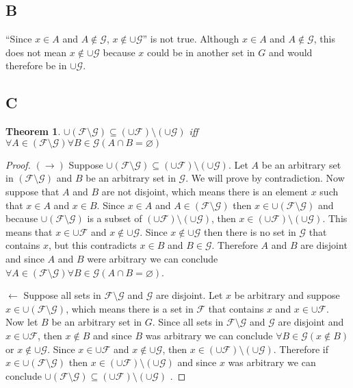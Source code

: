 \documentclass{article}
\newcommand{\F}{\mathcal{F}}
\newcommand{\G}{\mathcal{G}}
\newtheorem*{theorem}{Theorem}  %
\begin{document}
\subsection*{B}
``Since $x \in A$ and $A \notin \G$, $x \notin \cup \G$'' is not true. Although $x \in A$ and $A \notin \G$, this does not mean $x \notin \cup \G$ because $x$ could be in another set in $G$ and would therefore be in $\cup \G$.

\subsection*{C}
\begin{theorem} $\cup ( \F \setminus \G) \subseteq (\cup \F) \setminus (\cup \G)$ iff $ \forall A \in (\F \setminus \G) \forall B \in \G(A \cap B = \varnothing)$
\end{theorem}

\begin{proof} 
$(\rightarrow)$ Suppose $\cup ( \F \setminus \G) \subseteq (\cup \F) \setminus (\cup \G)$. Let $A$ be an arbitrary set in $(\F \setminus \G)$ and $B$ be an arbitrary set in $\G$. We will prove by contradiction. Now suppose that $A$ and $B$ are not disjoint, which means there is an element $x$ such that $x \in A$ and $x \in B$. Since $x \in A$ and $A \in (\F \setminus \G)$ then $x \in \cup (\F \setminus \G)$ and because $\cup (\F \setminus \G)$ is a subset of $(\cup \F) \setminus (\cup\G)$, then $x \in (\cup \F) \setminus (\cup \G)$. This means that $x \in \cup \F$ and $x \notin \cup \G$. Since $x \notin \cup \G$ then there is no set in $\G$ that contains $x$, but this contradicts $x \in B$ and $B \in \G$. Therefore $A$ and $B$ are disjoint and since $A$ and $B$ were arbitrary we can conclude $\forall A \in (\F \setminus \G) \forall B \in \G (A \cap B = \varnothing)$.

$\leftarrow$ Suppose all sets in $\F \setminus \G$ and $\G$ are disjoint. Let $x$ be arbitrary and suppose $x \in \cup(\F \setminus \G)$, which means there is a set in $\F$ that contains $x$ and $x \in \cup \F$. Now let $B$ be an arbitrary set in $G$. Since all sets in $\F \setminus \G$ and $\G$ are disjoint and $x \in \cup \F$, then $x \notin B$ and since $B$ was arbitrary we can conclude $\forall B \in \G(x \notin B)$ or $x \notin \cup \G$. Since $x \in \cup \F$ and $x \notin \cup \G$, then $x \in (\cup \F) \setminus (\cup \G)$. Therefore if $x \in \cup(\F \setminus \G)$ then $x \in ( \cup \F) \setminus (\cup \G)$ and since $x$ was arbitrary we can conclude  $\cup ( \F \setminus \G) \subseteq (\cup \F) \setminus (\cup \G)$ .
\end{proof}
\end{document}
